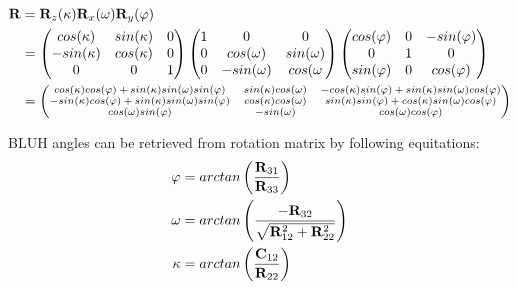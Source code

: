 \documentclass[a4paper,12pt]{article}
\newcommand{\ematr}[1]{%
{\bf #1}%
}
\newcommand{\escal}[1]{%
{\it #1}%
}
\begin{document}
 \begin{equation}
 \begin{split}
 \label{eq:rot}
\ematr{R} &= \ematr{R}_{z}(\escal{\kappa}) \ematr{R}_{x}(\escal{\omega}) \ematr{R}_{y}(\escal{\varphi}) \\
	  &= \begin{pmatrix}
	      cos(\escal{\kappa}) & sin(\escal{\kappa}) & 0 \\
	      -sin(\escal{\kappa}) & cos(\escal{\kappa}) & 0 \\
	      0 & 0 & 1
	      \end{pmatrix}
	      \begin{pmatrix}
	      1 & 0 & 0 \\
	      0 & cos(\escal{\omega}) & sin(\escal{\omega}) \\
	      0 & -sin(\escal{\omega}) & cos(\escal{\omega} 
	      \end{pmatrix}
	      \begin{pmatrix}
	      cos(\escal{\varphi}) & 0 & -sin(\escal{\varphi}) \\
	      0 & 1 & 0 \\
	      sin(\varphi) & 0 & cos(\varphi)      
	      \end{pmatrix} \\
	  &=  
	      \scriptsize
	      \begin{pmatrix}
	      cos(\escal{\kappa}) cos(\escal{\varphi}) + sin(\escal{\kappa}) sin(\escal{\omega}) sin(\escal{\varphi}) & 
	      sin(\escal{\kappa}) cos(\escal{\omega})  & 
	      -cos(\escal{\kappa}) sin(\escal{\varphi}) + sin(\escal{\kappa}) sin(\escal{\omega}) cos(\escal{\varphi}) 
	      \\
	      -sin(\escal{\kappa}) cos(\escal{\varphi}) + sin(\escal{\kappa}) sin(\escal{\omega}) sin(\escal{\varphi}) & 
	      cos(\escal{\kappa}) cos(\escal{\omega})  & 
	      sin(\escal{\kappa}) sin(\escal{\varphi}) + cos(\escal{\kappa}) sin(\escal{\omega}) cos(\escal{\varphi}) 
	      \\	      
	      cos(\escal{\omega}) sin(\escal{\varphi}) & 
	      -sin(\escal{\omega})  & 
	      cos(\escal{\omega}) cos(\escal{\varphi}) 
	      \\		      
	      \end{pmatrix} 
\end{split}
\end{equation}

BLUH angles can be retrieved from rotation matrix by following equitations: 
 \begin{equation}
 \begin{split}
\escal{\varphi} &=  arctan \left(\frac{\ematr{R}_{31}}{\ematr{R}_{33}} \right)\\
\escal{\omega} &= arctan \left(\frac{-\ematr{R}_{32}}{ \sqrt{ \ematr{R}_{12}^{2} + \ematr{R}_{22}^{2} }} \right)\\
\escal{\kappa} &=  arctan \left(\frac{\ematr{C}_{12}}{\ematr{R}_{22}} \right)
\end{split}
\end{equation}
\end{document}
